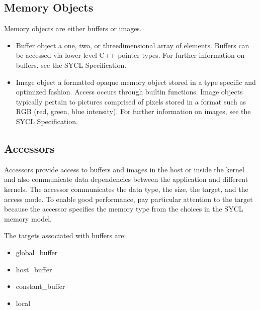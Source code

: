 \documentclass[letterpaper,10pt,english]{sphinxmanual}
\begin{document}
\subsection{Memory Objects}
\label{\detokenize{programming-model/memory-objects:memory-objects}}\label{\detokenize{programming-model/memory-objects:id1}}\label{\detokenize{programming-model/memory-objects::doc}}
Memory objects are either buffers or images.
\begin{itemize}
\item {} 
Buffer object \sphinxhyphen{} a one\sphinxhyphen{}, two\sphinxhyphen{}, or three\sphinxhyphen{}dimensional array of elements.
Buffers can be accessed via lower level C++ pointer types. For
further information on buffers, see the SYCL Specification.

\item {} 
Image object \sphinxhyphen{} a formatted opaque memory object stored in a type
specific and optimized fashion. Access occurs through built\sphinxhyphen{}in
functions. Image objects typically pertain to pictures comprised of
pixels stored in a format such as RGB (red, green, blue intensity).
For further information on images, see the SYCL Specification.

\end{itemize}


\subsection{Accessors}
\label{\detokenize{programming-model/accessors:accessors}}\label{\detokenize{programming-model/accessors:id1}}\label{\detokenize{programming-model/accessors::doc}}
Accessors provide access to buffers and images in the host or inside the
kernel and also communicate data dependencies between the application
and different kernels. The accessor communicates the data type, the
size, the target, and the access mode. To enable good performance, pay
particular attention to the target because the accessor specifies the
memory type from the choices in the SYCL memory model.

The targets associated with buffers are:
\begin{itemize}
\item {} 
global\_buffer

\item {} 
host\_buffer

\item {} 
constant\_buffer

\item {} 
local

\end{itemize}
\end{document}
